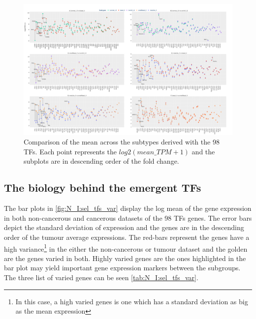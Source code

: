 \begin{figure}

    \centering
    \includegraphics[width=1.0\textwidth,keepaspectratio]{Sections/Network_I/Resources/selective_pruning/dumbell_sel_tfs.png}
      \caption{Comparison of the mean across the subtypes derived with the 98 TFs. Each point represents the $log2(mean\_TPM+1)$ and the subplots are in descending order of the fold change.}
    \label{fig:N_I:dumbell_sel_tfs}
\end{figure}

\newpage

\subsection{The biology behind the emergent TFs} \label{s:N_I:sel_tfs_bio}

The bar plots in \cref{fig:N_I:sel_tfs_var} display the log mean of the gene expression in both non-cancerous and cancerous datasets of the 98 TFs genes. The error bars depict the standard deviation of expression and the genes are in the descending order of the tumour average expressions. The red-bars represent the genes have a high variance\footnote{In this case, a high varied genes is one which has a standard deviation as big as the mean expression} in the either the non-cancerous or tumour dataset and the golden are the genes varied in both. Highly varied genes are the ones highlighted in the bar plot may yield important gene expression markers between the subgroups. The three list of varied genes can be seen \cref{tab:N_I:sel_tfs_var}.

